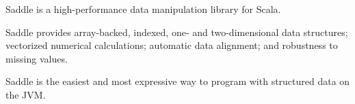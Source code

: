 Saddle is a high-performance data manipulation library for Scala.

Saddle provides array-backed, indexed, one- and two-dimensional data structures; vectorized numerical calculations; automatic data alignment; and robustness to missing values.

Saddle is the easiest and most expressive way to program with structured data on the JVM.
